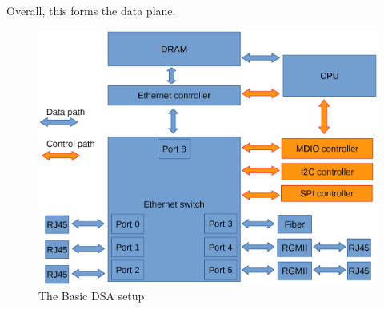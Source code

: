 \documentclass[letterpaper]{article}
\begin{document}
Overall, this forms the data plane.

\begin{figure}[ht]
  \centering
  \includegraphics[width=\columnwidth]{DSA-basic.eps}
  \caption{The Basic DSA setup}
  \label{dsa-basic}
\end{figure}
\end{document}
